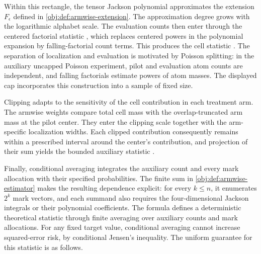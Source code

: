 \documentclass[11pt]{article}
\begin{document}
Within this rectangle, the tensor Jackson polynomial  approximates the extension \(F_\epsilon\) defined in \cref{obj:def:armwise-extension}. The approximation degree  grows with the logarithmic alphabet scale. The evaluation counts  then enter through the centered factorial statistic , which replaces centered powers in the polynomial expansion by falling-factorial count terms. This produces the cell statistic . The separation of localization and evaluation is motivated by Poisson splitting: in the auxiliary uncapped Poisson experiment, pilot and evaluation atom counts are independent, and falling factorials estimate powers of atom masses. The displayed cap incorporates this construction into a sample of fixed size.

Clipping adapts to the sensitivity of the cell contribution in each treatment arm. The armwise weights  compare total cell mass with the overlap-truncated arm mass at the pilot center. They enter the clipping scale  together with the arm-specific localization widths. Each clipped contribution  consequently remains within a prescribed interval around the center's contribution, and projection of their sum yields the bounded auxiliary statistic .

Finally, conditional averaging integrates the auxiliary count and every mark allocation with their specified probabilities. The finite sum in \cref{obj:def:armwise-estimator} makes the resulting dependence explicit: for every \(k\le n\), it enumerates \(2^k\) mark vectors, and each summand also requires the four-dimensional Jackson integrals or their polynomial coefficients. The formula defines a deterministic theoretical statistic through finite averaging over auxiliary counts and mark allocations. For any fixed target value, conditional averaging cannot increase squared-error risk, by conditional Jensen's inequality. The uniform guarantee for this statistic is as follows.
\end{document}
